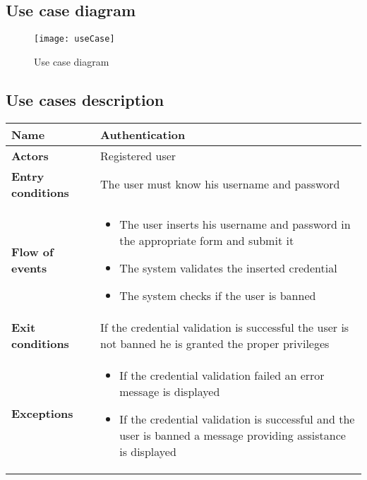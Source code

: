 \newpage\subsection{Use case diagram}
\begin{figure}[h]
			\centering
			\texttt{[image: useCase]}
			\caption{
				\label{fig:useCase} 
				Use case diagram
			}
		\end{figure}
\subsection{Use cases description}
\begin{tabular}{p{0.25\linewidth}p{0.75\linewidth}}
\toprule
\textbf{Name} & Authentication \\
\midrule
\textbf{Actors} &  Registered user \\
\midrule
\textbf{Entry conditions} & The user must know his username and password \\
\midrule
\textbf{Flow of events} & 
\begin{itemize}
	\item The user inserts his username and password in the appropriate form and submit it
	\item The system validates the inserted credential
	\item The system checks if the user is banned
\end{itemize} \\
\midrule
\textbf{Exit conditions} & If the credential validation is successful the user is not banned he is granted the proper privileges\\
\midrule
\textbf{Exceptions} & 
\begin{itemize}
	\item If the credential validation failed an error message is displayed
	\item If the credential validation is successful and the user is banned a message providing assistance is displayed
\end{itemize} \\
\bottomrule
\end{tabular}

